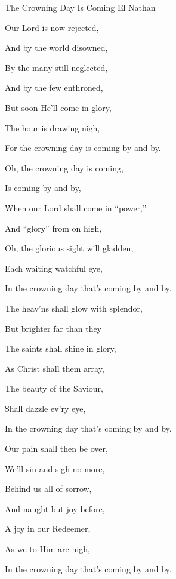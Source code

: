 \documentclass[12pt]{book}
\begin{document}
\begin{song}{The Crowning Day Is Coming}{}
  {\SBPubDom}
  {El Nathan}
  {}
  {}

  \begin{SBVerse}
    Our Lord is now rejected,

    And by the world disowned,

    By the many still neglected,

    And by the few enthroned,

    But soon He'll come in glory,

    The hour is drawing nigh,

    For the crowning day is coming by and by.
  \end{SBVerse}

  \begin{SBOpGroup}
    Oh, the crowning day is coming,

    Is coming by and by,

    When our Lord shall come in ``power,''

    And ``glory'' from on high,

    Oh, the glorious sight will gladden,

    Each waiting watchful eye,

    In the crowning day that's coming by and by.
  \end{SBOpGroup}

  \begin{SBVerse}
    The heav'ns shall glow with splendor,

    But brighter far than they

    The saints shall shine in glory,

    As Christ shall them array,

    The beauty of the Saviour,

    Shall dazzle ev'ry eye,

    In the crowning day that's coming by and by.
  \end{SBVerse}

  \begin{SBVerse}
    Our pain shall then be over,

    We'll sin and sigh no more,

    Behind us all of sorrow,

    And naught but joy before,

    A joy in our Redeemer,

    As we to Him are nigh,

    In the crowning day that's coming by and by.
  \end{SBVerse}


\end{song}
\end{document}
